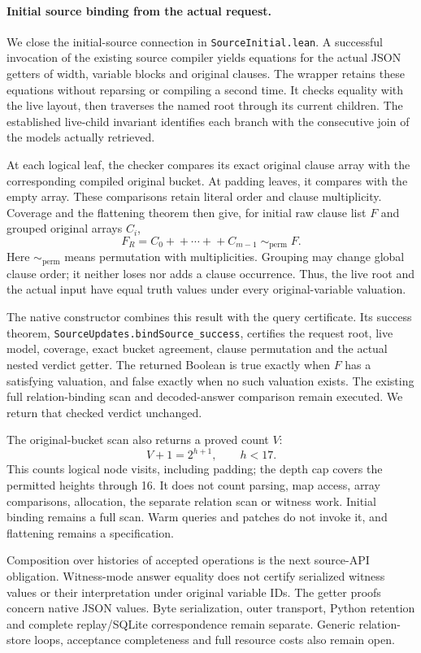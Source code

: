 \documentclass[11pt,a4paper]{article}
\numberwithin{equation}{section}
\theoremstyle{plain}
\theoremstyle{definition}
\theoremstyle{remark}
\begin{document}
\paragraph{Initial source binding from the actual request.}
We close the initial-source connection in \texttt{SourceInitial.lean}. A successful invocation of the existing source compiler yields equations for the actual JSON getters of width, variable blocks and original clauses. The wrapper retains these equations without reparsing or compiling a second time. It checks equality with the live layout, then traverses the named root through its current children. The established live-child invariant identifies each branch with the consecutive join of the models actually retrieved.

At each logical leaf, the checker compares its exact original clause array with the corresponding compiled original bucket. At padding leaves, it compares with the empty array. These comparisons retain literal order and clause multiplicity. Coverage and the flattening theorem then give, for initial raw clause list $F$ and grouped original arrays $C_i$,
\[
F_R=C_0+\!+\cdots+\!+C_{m-1}
       \;\sim_{\mathrm{perm}}\; F.
\]
Here $\sim_{\mathrm{perm}}$ means permutation with multiplicities. Grouping may change global clause order; it neither loses nor adds a clause occurrence. Thus, the live root and the actual input have equal truth values under every original-variable valuation.

The native constructor combines this result with the query certificate. Its success theorem, \texttt{SourceUpdates.bindSource\_success}, certifies the request root, live model, coverage, exact bucket agreement, clause permutation and the actual nested verdict getter. The returned Boolean is true exactly when $F$ has a satisfying valuation, and false exactly when no such valuation exists. The existing full relation-binding scan and decoded-answer comparison remain executed. We return that checked verdict unchanged.

The original-bucket scan also returns a proved count $V$:
\[
V+1=2^{h+1},\qquad h<17.
\]
This counts logical node visits, including padding; the depth cap covers the permitted heights through 16. It does not count parsing, map access, array comparisons, allocation, the separate relation scan or witness work. Initial binding remains a full scan. Warm queries and patches do not invoke it, and flattening remains a specification.

Composition over histories of accepted operations is the next source-API obligation. Witness-mode answer equality does not certify serialized witness values or their interpretation under original variable IDs. The getter proofs concern native JSON values. Byte serialization, outer transport, Python retention and complete replay/SQLite correspondence remain separate. Generic relation-store loops, acceptance completeness and full resource costs also remain open.
\end{document}
